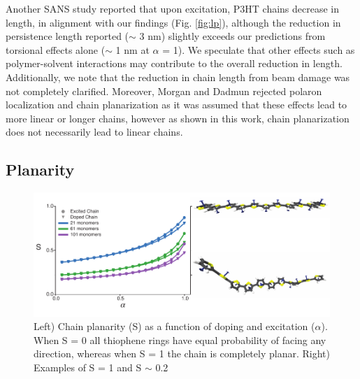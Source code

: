 Another SANS study reported that upon excitation, P3HT chains decrease in length, in alignment with our findings (Fig. \ref{fig:lp}), although the reduction in persistence length reported ($\sim$ 3 nm) slightly exceeds our predictions from torsional effects alone ($\sim$ 1 nm at $\alpha$ = 1).\cite{Morgan2016} We speculate that other effects such as polymer-solvent interactions may contribute to the overall reduction in length. Additionally, we note that the reduction in chain length from beam damage was not completely clarified. Moreover, Morgan and Dadmun rejected polaron localization and chain planarization as it was assumed that these effects lead to more linear or longer chains, however as shown in this work, chain planarization does not necessarily lead to linear chains.

\subsection{Planarity}

\begin{figure}
    \centering
    \includegraphics{figures/chap2/S.pdf}
    \caption{Left) Chain planarity (S) as a function of doping and excitation ($\alpha$). When S = 0 all thiophene rings have equal probability of facing any direction, whereas when S = 1 the chain is completely planar. Right) Examples of S = 1 and S $\sim$ 0.2}
    \label{fig:s_order}
\end{figure}

